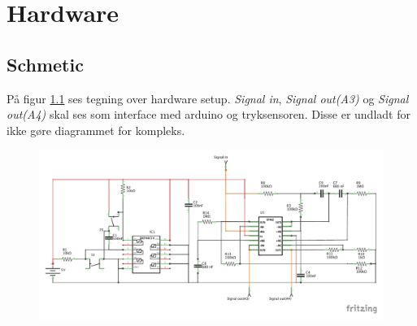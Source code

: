 \newpage
\chapter{Hardware}

\section{Schmetic}
På figur \ref{fig:schematics} ses tegning over hardware setup. \textit{Signal in}, \textit{Signal out(A3)} og \textit{Signal out(A4)} skal ses som interface med arduino og tryksensoren. Disse er undladt for ikke gøre diagrammet for kompleks.
\begin{figure}[H]
	\includegraphics[trim = 0 30 0 0, clip=true, width = \textwidth]{Implementeringsdokument/billeder/Konditionering_schem.pdf}
	\caption{}\label{fig:schematics}
\end{figure}

\newpage

